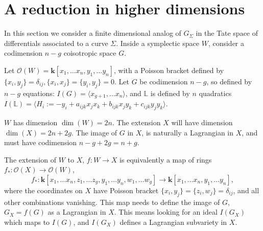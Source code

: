     
    
    \section{A reduction in higher dimensions}
    \label{subsec:gdimG}
    
    
    
    
    In this section we consider a finite dimensional analog of 
    \(G_\Sigma\) in the Tate space of differentials associated to a curve \( \Sigma\). Inside a symplectic space \(W\), consider a codimension \(n-g\) coisotropic space \(G\).
    
    \begin{ex}
    Let \( \mathcal{O}(W) = \mathbf{k}[x_1, \dots x_n, y_1, \dots y_n]\), with a Poisson bracket defined by \( \{x_i,y_j\}=\delta_{ij}, \{x_i,x_j\}=\{y_i,y_j\} = 0\).
    Let \(G\) be codimension \(n-g\), so defined by \(n-g\) equations:
    \(I(G) = \langle x_{g+1}, \dots x_n  \rangle\), and 
    \( \mathbb{L}\) is defined by \(n\) quadratics 
    \( I(\mathbb{L}) =  \langle H_i := -y_i + a_{ijk}x_jx_k + b_{ijk}x_jy_k+c_{ijk}y_jy_k \rangle \). 
    \end{ex}
    \(W\) has dimension \(\dim(W)=2n\). The extension \(X\) will have dimension \(\dim(X)=2n+2g\). The image of \(G\) in \(X\), is naturally a Lagrangian in \(X\), and must have codimension \(n-g+2g=n+g\).
    
    The extension of \(W\) to \(X\), \( f : W\rightarrow X\)  is equivalently a map of rings \(f_{*}: \mathcal{O}(X) \rightarrow \mathcal{O}(W)\),
    \[f_{*} : \mathbf{k}[x_1, \dots x_n,z_1, \dots z_g, y_1, \dots y_n,w_1,\dots w_g]\rightarrow \mathbf{k}[x_1, \dots x_n ,y_1, \dots y_n], \]
    where the coordinates on \(X\) have Poisson bracket \( \{x_i, y_j\}=\{z_i,w_j\}= \delta_{ij}\), and all other combinations vanishing. This map needs to define the image of \(G\), \( G_X = f(G) \) as a Lagrangian in \(X\). This means looking for an ideal \( I(G_X) \) which maps to \( I(G)\), and \( I(G_X)\) defines a Lagrangian subvariety in \(X\).
    
